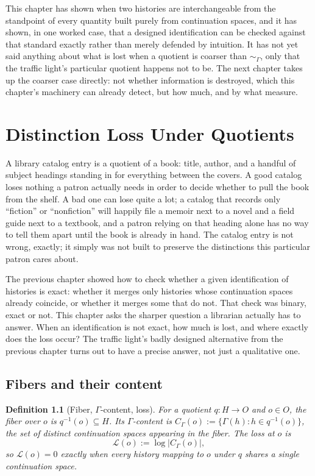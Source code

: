\documentclass[11pt]{report}
\newtheorem{definition}{Definition}[chapter]
\begin{document}
This chapter has shown when two histories are interchangeable from
the standpoint of every quantity built purely from continuation
spaces, and it has shown, in one worked case, that a designed
identification can be checked against that standard exactly rather
than merely defended by intuition. It has not yet said anything about
what is lost when a quotient is coarser than $\sim_\Gamma$, only that
the traffic light's particular quotient happens not to be. The next
chapter takes up the coarser case directly: not whether information is
destroyed, which this chapter's machinery can already detect, but how
much, and by what measure.

\chapter{Distinction Loss Under Quotients}

A library catalog entry is a quotient of a book: title, author, and a
handful of subject headings standing in for everything between the
covers. A good catalog loses nothing a patron actually needs in order
to decide whether to pull the book from the shelf. A bad one can lose
quite a lot; a catalog that records only ``fiction'' or
``nonfiction'' will happily file a memoir next to a novel and a field
guide next to a textbook, and a patron relying on that heading alone
has no way to tell them apart until the book is already in hand. The
catalog entry is not wrong, exactly; it simply was not built to
preserve the distinctions this particular patron cares about.

The previous chapter showed how to check whether a given
identification of histories is exact: whether it merges only
histories whose continuation spaces already coincide, or whether it
merges some that do not. That check was binary, exact or not. This
chapter asks the sharper question a librarian actually has to answer.
When an identification is not exact, how much is lost, and where
exactly does the loss occur? The traffic light's badly designed
alternative from the previous chapter turns out to have a precise
answer, not just a qualitative one.

\section*{Fibers and their content}

\begin{definition}[Fiber, $\Gamma$-content, loss]
For a quotient $q : H \to O$ and $o \in O$, the fiber over $o$ is
$q^{-1}(o) \subseteq H$. Its $\Gamma$-content is
$C_\Gamma(o) := \{\Gamma(h) : h \in q^{-1}(o)\}$, the set of distinct
continuation spaces appearing in the fiber. The loss at $o$ is
\[
\mathcal{L}(o) := \log |C_\Gamma(o)|,
\]
so $\mathcal{L}(o) = 0$ exactly when every history mapping to $o$
under $q$ shares a single continuation space.
\end{definition}
\end{document}

